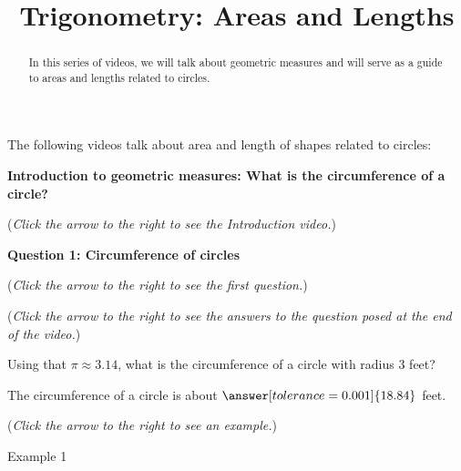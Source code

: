 \documentclass{ximera}
\title[Prerequisite Videos: ]{Trigonometry: Areas and Lengths}
\begin{document}
\begin{abstract}
  In this series of videos, we will talk about geometric measures and will
  serve as a guide to areas and lengths related to circles.
\end{abstract}
\maketitle

The following videos talk about area and length of shapes related to circles:

\textbf{Introduction to geometric measures: What is the circumference
of a circle?}
\begin{explanation}
\begin{flushright}
{\color{blue}(\emph{Click the arrow to the right to see the Introduction video.})}
\end{flushright}
\begin{center}
\begin{expandable}
\end{expandable}
\end{center}
\end{explanation}

\textbf{Question 1: Circumference of circles}
\begin{question}
\begin{flushright}
{\color{blue}(\emph{Click the arrow to the right to see the first question.})}
\end{flushright}
\begin{center}
\begin{expandable}
{\color{blue}(\emph{Click the arrow to the right to see the answers 
to the question posed at the end of the video.})}
\begin{expandable}
Using that $\pi\approx 3.14$, what is the circumference of a circle with radius $3$ feet?\\
\begin{prompt}
The circumference of a circle is about $\answer[tolerance=0.001]{18.84}$ feet.
\end{prompt}
\begin{flushright}
{\color{blue}(\emph{Click the arrow to the right to see an example.})}
\end{flushright}
\begin{expandable}
Example 1
\end{expandable}
\end{expandable}
\end{expandable}
\end{center}
\end{question}
\end{document}
